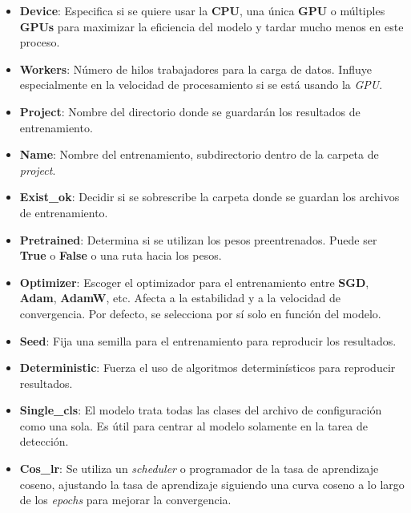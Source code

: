 \documentclass[12pt,a4paper,onecolumn,oneside]{report}
\begin{document}
\begin{itemize}
    \item \textbf{Device}: Especifica si se quiere usar la \textbf{CPU}, una única \textbf{GPU} o múltiples \textbf{GPUs} para maximizar la eficiencia del modelo y tardar mucho menos en este proceso.

    \item \textbf{Workers}: Número de hilos trabajadores para la carga de datos. Influye especialmente en la velocidad de procesamiento si se está usando la \textit{GPU}.

    \item \textbf{Project}: Nombre del directorio donde se guardarán los resultados de entrenamiento.

    \item \textbf{Name}: Nombre del entrenamiento, subdirectorio dentro de la carpeta de \textit{project}.
    
    \item \textbf{Exist\_ok}: Decidir si se sobrescribe la carpeta donde se guardan los archivos de entrenamiento.

    \item \textbf{Pretrained}: Determina si se utilizan los pesos preentrenados. Puede ser \textbf{True} o \textbf{False} o una ruta hacia los pesos.

    \item \textbf{Optimizer}: Escoger el optimizador para el entrenamiento entre \textbf{SGD}, \textbf{Adam}, \textbf{AdamW}, etc. Afecta a la estabilidad y a la velocidad de convergencia. Por defecto, se selecciona por sí solo en función del modelo.

    \item \textbf{Seed}: Fija una semilla para el entrenamiento para reproducir los resultados.

    \item \textbf{Deterministic}: Fuerza el uso de algoritmos determinísticos para reproducir resultados.

    \item \textbf{Single\_cls}: El modelo trata todas las clases del archivo de configuración como una sola. Es útil para centrar al modelo solamente en la tarea de detección.

    \item \textbf{Cos\_lr}: Se utiliza un \textit{scheduler} o programador de la tasa de aprendizaje coseno, ajustando la tasa de aprendizaje siguiendo una curva coseno a lo largo de los \textit{epochs} para mejorar la convergencia.


\end{itemize}
\end{document}
